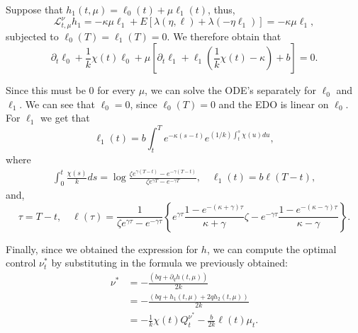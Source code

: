 Suppose that $h_1(t,\mu)= \ell_0 (t) + \mu \ell_1(t)$,
thus,
\begin{displaymath}
  \mathcal L^\nu_{t,\mu} h_1 = -\kappa \mu \ell_1 + E[\lambda(\eta,\ell) + \lambda(-\eta \ell_1)] =
  -\kappa \mu \ell_1,
\end{displaymath}
subjected to $\ell_0(T)=\ell_1(T)=0$. We therefore obtain that
\begin{displaymath}
  \partial_t \ell_0 + \frac{1}{k} \chi(t)\ell_0 +
  \mu\left[
  \partial_t \ell_1 + \ell_1\left(
    \frac{1}{k} \chi(t) - \kappa
    \right) + b
    \right] = 0.
\end{displaymath}

Since this must be 0 for every $\mu$, we can solve the ODE's separately 
for $\ell_0$ and $\ell_1$. We can see that $\ell_0 = 0$, since $\ell_0(T) = 0$
and the EDO is linear on $\ell_0$. For $\ell_1$ we get that
\begin{displaymath}
 \ell_1(t)  = b \int^T_t e^{-\kappa(s-t)}e^{(1/k)\int^s_t \chi(u) du},
\end{displaymath}
where
\begin{align*}
  \int^t_0 \frac{\chi(s)}{k} ds =
  \log \frac{\zeta e^{\gamma(T-t)} - e^{-\gamma (T-t)}}{\zeta e^{\gamma T} - e^{-\gamma T}}, \quad
  \ell_1(t) = b \ell(T-t),
\end{align*}
 and,
\begin{displaymath}
  \tau = T-t, \quad
\ell(\tau) =\frac{1}{\zeta e^{\gamma \tau}-
  e^{-\gamma \tau}}\left\{e^{\gamma \tau}
\frac{1-e^{-(\kappa+\gamma) \tau}}{\kappa+\gamma}
\zeta-e^{-\gamma \tau} \frac{1-e^{-(\kappa-\gamma) \tau}}{\kappa-\gamma}\right\}.
\end{displaymath}

Finally, since we obtained the expression for $h$,
we can compute the optimal control $\nu_t^*$ by substituting in the formula we previously obtained:
\begin{align*}
  \nu^* &= -\frac{(bq + \partial_q h(t,\mu))}{2k} \\
        &= 
  -\frac{(bq + h_1(t,\mu) + 2q h_2(t,\mu))}{2k}\\
        &= 
  -\frac{1}{k} \chi(t)Q^{\nu^*}_t - \frac{b}{2k} \ell(t)\mu_t.
\end{align*}



